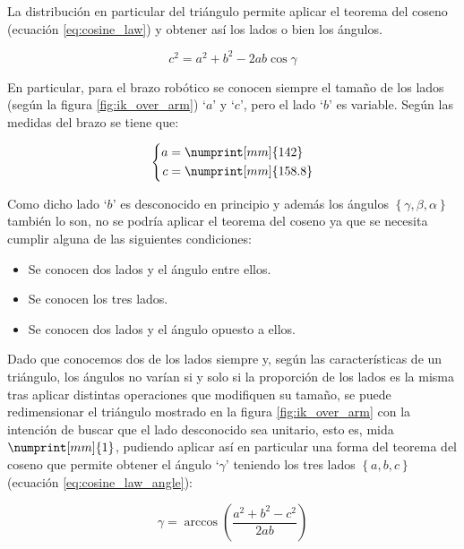 La distribución en particular del triángulo permite aplicar el teorema del coseno (ecuación
\ref{eq:cosine_law}) y obtener así los lados o bien los ángulos.

\begin{equation}\label{eq:cosine_law}
    c^2 = a^2 + b^2 - 2ab\cos{\gamma}
\end{equation}

En particular, para el brazo robótico se conocen siempre el tamaño de los lados
(según la figura \ref{fig:ik_over_arm}) `$a$' y `$c$', pero el lado `$b$' es variable. Según las
medidas del brazo se tiene que:

\begin{equation*}
    \left\{
    \begin{aligned}
        a & = \numprint[mm]{142}   \\
        c & = \numprint[mm]{158.8}
    \end{aligned}
    \right.
\end{equation*}

Como dicho lado `$b$' es desconocido en principio y además los ángulos $\left\{\gamma, \beta, \alpha\right\}$
también lo son, no se podría aplicar el teorema del coseno ya que se necesita cumplir alguna de las
siguientes condiciones:

\begin{itemize}
    \item Se conocen dos lados y el ángulo entre ellos.
    \item Se conocen los tres lados.
    \item Se conocen dos lados y el ángulo opuesto a ellos.
\end{itemize}

Dado que conocemos dos de los lados siempre y, según las características de un triángulo,
los ángulos no varían si y solo si la proporción de los lados es la misma tras aplicar
distintas operaciones que modifiquen su tamaño, se puede redimensionar el triángulo
mostrado en la figura \ref{fig:ik_over_arm} con la intención de buscar que el lado
desconocido sea unitario, esto es, mida $\numprint[mm]{1}$, pudiendo aplicar así en particular una forma del
teorema del coseno que permite obtener el ángulo `$\gamma$' teniendo los tres lados $\left\{a,b,c\right\}$
(ecuación \ref{eq:cosine_law_angle}):

\begin{equation}\label{eq:cosine_law_angle}
    \gamma = \arccos{\left(\frac{a^2 + b^2 - c^2}{2ab}\right)}
\end{equation}

